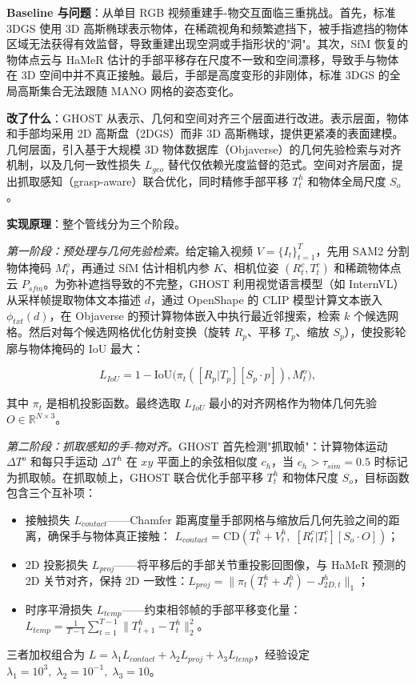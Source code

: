 \textbf{Baseline 与问题}：从单目 RGB 视频重建手-物交互面临三重挑战。首先，标准 3DGS 使用 3D 高斯椭球表示物体，在稀疏视角和频繁遮挡下，被手指遮挡的物体区域无法获得有效监督，导致重建出现空洞或手指形状的"洞"。其次，SfM 恢复的物体点云与 HaMeR 估计的手部平移存在尺度不一致和空间漂移，导致手与物体在 3D 空间中并不真正接触。最后，手部是高度变形的非刚体，标准 3DGS 的全局高斯集合无法跟随 MANO 网格的姿态变化。

\textbf{改了什么}：GHOST 从表示、几何和空间对齐三个层面进行改进。表示层面，物体和手部均采用 2D 高斯盘（2DGS）而非 3D 高斯椭球，提供更紧凑的表面建模。几何层面，引入基于大规模 3D 物体数据库（Objaverse）的几何先验检索与对齐机制，以及几何一致性损失 $L_{geo}$ 替代仅依赖光度监督的范式。空间对齐层面，提出抓取感知（grasp-aware）联合优化，同时精修手部平移 $T_t^h$ 和物体全局尺度 $S_o$。

\textbf{实现原理}：整个管线分为三个阶段。

\emph{第一阶段：预处理与几何先验检索。}给定输入视频 $V = \{I_t\}_{t=1}^T$，先用 SAM2 分割物体掩码 $M_t^o$，再通过 SfM 估计相机内参 $K$、相机位姿 $(R_t^c, T_t^c)$ 和稀疏物体点云 $P_{sfm}$。为弥补遮挡导致的不完整，GHOST 利用视觉语言模型（如 InternVL）从采样帧提取物体文本描述 $d$，通过 OpenShape 的 CLIP 模型计算文本嵌入 $\phi_{txt}(d)$，在 Objaverse 的预计算物体嵌入中执行最近邻搜索，检索 $k$ 个候选网格。然后对每个候选网格优化仿射变换（旋转 $R_p$、平移 $T_p$、缩放 $S_p$），使投影轮廓与物体掩码的 IoU 最大：

\begin{equation}
L_{IoU} = 1 - \text{IoU}\bigl(\pi_t([R_p|T_p][S_p \cdot p]), M_t^o\bigr),
\end{equation}

其中 $\pi_t$ 是相机投影函数。最终选取 $L_{IoU}$ 最小的对齐网格作为物体几何先验 $O \in \mathbb{R}^{N \times 3}$。

\emph{第二阶段：抓取感知的手-物对齐。}GHOST 首先检测"抓取帧"：计算物体运动 $\Delta T^o$ 和每只手运动 $\Delta T^h$ 在 $xy$ 平面上的余弦相似度 $c_h$，当 $c_h > \tau_{sim}=0.5$ 时标记为抓取帧。在抓取帧上，GHOST 联合优化手部平移 $T_t^h$ 和物体尺度 $S_o$，目标函数包含三个互补项：
\begin{itemize}
    \item 接触损失 $L_{contact}$——Chamfer 距离度量手部网格与缩放后几何先验之间的距离，确保手与物体真正接触：
    $L_{contact} = \text{CD}(T_t^h + V_t^h,\; [R_t^c | T_t^c][S_o \cdot O])$；
    \item 2D 投影损失 $L_{proj}$——将平移后的手部关节重投影回图像，与 HaMeR 预测的 2D 关节对齐，保持 2D 一致性：$L_{proj} = \|\pi_t(T_t^h + J_t^h) - J_{2D,t}^h\|_1$；
    \item 时序平滑损失 $L_{temp}$——约束相邻帧的手部平移变化量：$L_{temp} = \frac{1}{T-1}\sum_{t=1}^{T-1}\|T_{t+1}^h - T_t^h\|_2^2$。
\end{itemize}
三者加权组合为 $L = \lambda_1 L_{contact} + \lambda_2 L_{proj} + \lambda_3 L_{temp}$，经验设定 $\lambda_1=10^3,\; \lambda_2=10^{-1},\; \lambda_3=10$。

